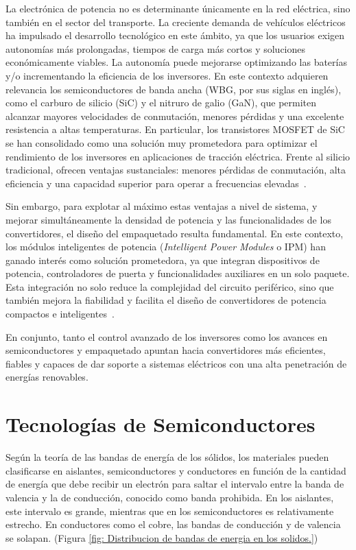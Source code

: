 La electrónica de potencia no es determinante únicamente en la red eléctrica, sino también en el sector del transporte. La creciente demanda de vehículos eléctricos ha impulsado el desarrollo tecnológico en este ámbito, ya que los usuarios exigen autonomías más prolongadas, tiempos de carga más cortos y soluciones económicamente viables. La autonomía puede mejorarse optimizando las baterías y/o incrementando la eficiencia de los inversores. En este contexto adquieren relevancia los semiconductores de banda ancha (WBG, por sus siglas en inglés), como el carburo de silicio (SiC) y el nitruro de galio (GaN), que permiten alcanzar mayores velocidades de conmutación, menores pérdidas y una excelente resistencia a altas temperaturas. En particular, los transistores MOSFET de SiC se han consolidado como una solución muy prometedora para optimizar el rendimiento de los inversores en aplicaciones de tracción eléctrica. Frente al silicio tradicional, ofrecen ventajas sustanciales: menores pérdidas de conmutación, alta eficiencia y una capacidad superior para operar a frecuencias elevadas~\cite{11648147}.

Sin embargo, para explotar al máximo estas ventajas a nivel de sistema, y mejorar simultáneamente la densidad de potencia y las funcionalidades de los convertidores, el diseño del empaquetado resulta fundamental. En este contexto, los módulos inteligentes de potencia (\textit{Intelligent Power Modules} o IPM) han ganado interés como solución prometedora, ya que integran dispositivos de potencia, controladores de puerta y funcionalidades auxiliares en un solo paquete. Esta integración no solo reduce la complejidad del circuito periférico, sino que también mejora la fiabilidad y facilita el diseño de convertidores de potencia compactos e inteligentes~\cite{11630585}.

En conjunto, tanto el control avanzado de los inversores como los avances en semiconductores y empaquetado apuntan hacia convertidores más eficientes, fiables y capaces de dar soporte a sistemas eléctricos con una alta penetración de energías renovables.

\section{Tecnologías de Semiconductores}


Según la teoría de las bandas de energía de los sólidos, los materiales pueden clasificarse en aislantes, semiconductores y conductores en función de la cantidad de energía que debe recibir un electrón para saltar el intervalo entre la banda de valencia y la de conducción, conocido como banda prohibida. En los aislantes, este intervalo es grande, mientras que en los semiconductores es relativamente estrecho. En conductores como el cobre, las bandas de conducción y de valencia se solapan. (Figura \ref{fig: Distribucion de bandas de energia en los solidos.})

